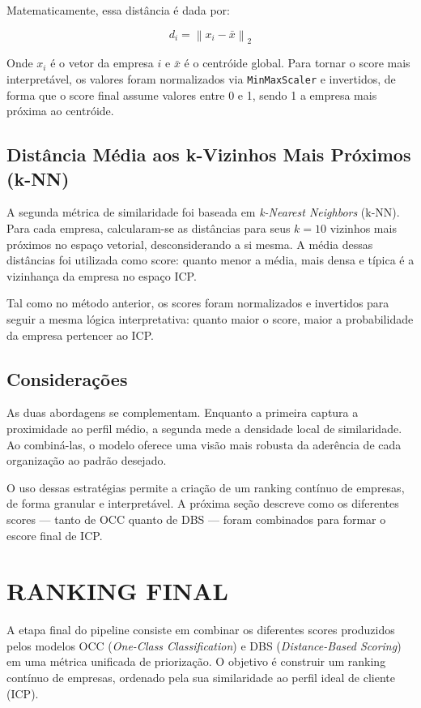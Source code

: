 Matematicamente, essa distância é dada por:

\begin{equation}
d_i = \left\| x_i - \bar{x} \right\|_2
\end{equation}

Onde $x_i$ é o vetor da empresa $i$ e $\bar{x}$ é o centróide global. Para tornar o score mais interpretável, os valores foram normalizados via \texttt{MinMaxScaler} e invertidos, de forma que o score final assume valores entre 0 e 1, sendo 1 a empresa mais próxima ao centróide.

\subsection{\textbf{Distância Média aos k-Vizinhos Mais Próximos (k-NN)}}

A segunda métrica de similaridade foi baseada em \textit{k-Nearest Neighbors} (k-NN). Para cada empresa, calcularam-se as distâncias para seus $k = 10$ vizinhos mais próximos no espaço vetorial, desconsiderando a si mesma. A média dessas distâncias foi utilizada como score: quanto menor a média, mais densa e típica é a vizinhança da empresa no espaço ICP.

Tal como no método anterior, os scores foram normalizados e invertidos para seguir a mesma lógica interpretativa: quanto maior o score, maior a probabilidade da empresa pertencer ao ICP.

\subsection{\textbf{Considerações}}

As duas abordagens se complementam. Enquanto a primeira captura a proximidade ao perfil médio, a segunda mede a densidade local de similaridade. Ao combiná-las, o modelo oferece uma visão mais robusta da aderência de cada organização ao padrão desejado.

O uso dessas estratégias permite a criação de um ranking contínuo de empresas, de forma granular e interpretável. A próxima seção descreve como os diferentes scores — tanto de OCC quanto de DBS — foram combinados para formar o escore final de ICP.

\section{RANKING FINAL}

A etapa final do pipeline consiste em combinar os diferentes scores produzidos pelos modelos OCC (\textit{One-Class Classification}) e DBS (\textit{Distance-Based Scoring}) em uma métrica unificada de priorização. O objetivo é construir um ranking contínuo de empresas, ordenado pela sua similaridade ao perfil ideal de cliente (ICP).


